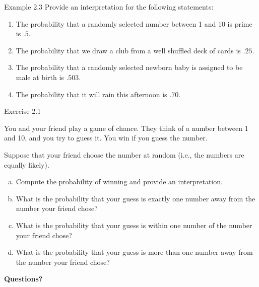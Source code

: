 \documentclass[aspectratio=169,xcolor=pdftex,dvipsnames,table]{beamer}\usepackage[]{graphicx}\usepackage[]{xcolor}
\begin{document}
\begin{frame}{Example 2.3}
  Provide an interpretation for the following statements:
  \begin{enumerate}
  \item The probability that a randomly selected number between 1 and 10 is prime is $.5$.
  \item The probability that we draw a club from a well shuffled deck of cards is $.25$.
  \item The probability that a randomly selected newborn baby is assigned to be male at birth is $.503$. 
  \item The probability that it will rain this afternoon is $.70$.
  \end{enumerate}
\end{frame}

\begin{frame}{Exercise 2.1}

You and your friend play a game of chance. They think of a number between 1 and 10, and you try to guess it. You win if you guess the number. 

Suppose that your friend choose the number at random (i.e., the numbers are equally likely). 

\begin{enumerate}[a)]
\item Compute the probability of winning and provide an interpretation.
\item What is the probability that your guess is exactly one number away from the number your friend chose?
\item What is the probability that your guess is within one number of the number your friend chose?
\item What is the probability that your guess is more than one number away from the number your friend chose?
\end{enumerate}
\end{frame}

\begin{frame}
  \begin{center}
    \Large{\textbf{Questions?}}
  \end{center}
\end{frame}
\end{document}
